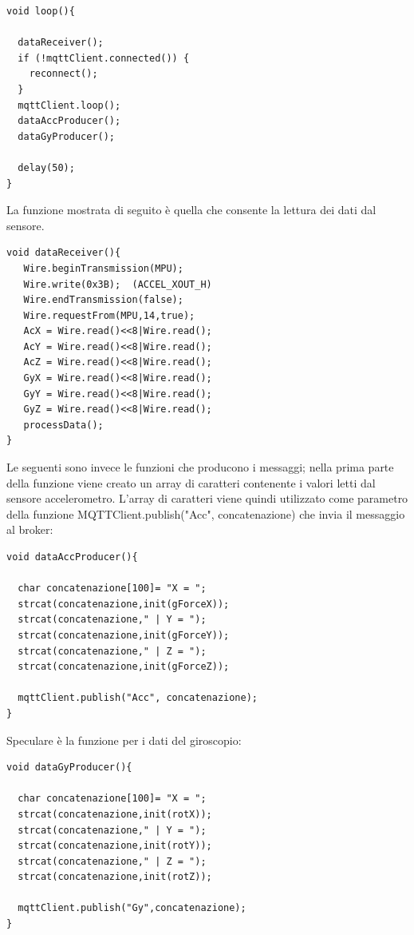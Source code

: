 \documentclass[]{scrartcl}
\begin{document}
\begingroup
\fontsize{9.5pt}{8pt}\selectfont
\begin{lstlisting}[frame=single]
void loop(){

  dataReceiver();
  if (!mqttClient.connected()) {
    reconnect();
  }
  mqttClient.loop(); 
  dataAccProducer();
  dataGyProducer();

  delay(50);
}
\end{lstlisting}
\endgroup
\newpage
La funzione mostrata di seguito è quella che consente la lettura dei dati dal sensore.
\begingroup
\fontsize{9.5pt}{8pt}\selectfont
\begin{lstlisting}[frame=single]
void dataReceiver(){
   Wire.beginTransmission(MPU);
   Wire.write(0x3B);  (ACCEL_XOUT_H)
   Wire.endTransmission(false);
   Wire.requestFrom(MPU,14,true); 
   AcX = Wire.read()<<8|Wire.read(); 
   AcY = Wire.read()<<8|Wire.read();  
   AcZ = Wire.read()<<8|Wire.read(); 
   GyX = Wire.read()<<8|Wire.read();  
   GyY = Wire.read()<<8|Wire.read(); 
   GyZ = Wire.read()<<8|Wire.read(); 
   processData();
}
\end{lstlisting}
\endgroup

Le seguenti sono invece le funzioni che producono i messaggi; nella prima parte della funzione viene creato un array di caratteri contenente i valori letti dal sensore accelerometro. L'array di caratteri viene quindi utilizzato come parametro della funzione MQTTClient.publish("Acc", concatenazione) che invia il messaggio al broker:

\begingroup
\fontsize{9.5pt}{8pt}\selectfont
\begin{lstlisting}[frame=single]
void dataAccProducer(){

  char concatenazione[100]= "X = ";   
  strcat(concatenazione,init(gForceX));
  strcat(concatenazione," | Y = ");
  strcat(concatenazione,init(gForceY));
  strcat(concatenazione," | Z = ");
  strcat(concatenazione,init(gForceZ));

  mqttClient.publish("Acc", concatenazione);
}
\end{lstlisting}
\endgroup

Speculare è la funzione per i dati del giroscopio:

\begingroup
\fontsize{9.5pt}{8pt}\selectfont
\begin{lstlisting}[frame=single]
void dataGyProducer(){

  char concatenazione[100]= "X = ";
  strcat(concatenazione,init(rotX));
  strcat(concatenazione," | Y = ");
  strcat(concatenazione,init(rotY));
  strcat(concatenazione," | Z = ");
  strcat(concatenazione,init(rotZ));
  
  mqttClient.publish("Gy",concatenazione);
}
\end{lstlisting}
\endgroup
\end{document}
